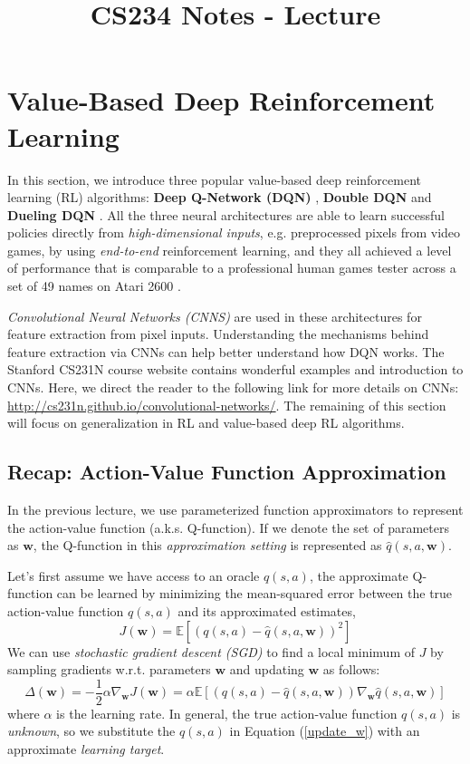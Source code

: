 \documentclass{article}
\title{CS234 Notes - Lecture \lecturenum \\ \lecturetitle }
\author{ \lecturescribe }
\newcommand{\E}{\mathbb{E}}                                        %
\newcommand{\w}{\mathbf{w}}
\begin{document}
\maketitle

\section{Value-Based Deep Reinforcement Learning}
In this section, we introduce three popular value-based deep reinforcement learning (RL) algorithms: \textbf{Deep Q-Network (DQN)} \cite{ref_DQN}, \textbf{Double DQN} \cite{ref_DDQN} and \textbf{Dueling DQN} \cite{ref_DuelingDQN}. All the three neural architectures are able to learn successful policies directly from \textit{high-dimensional inputs}, e.g. preprocessed pixels from video games, by using \textit{end-to-end} reinforcement learning, and they all achieved a level of performance that is comparable to a professional human games tester across a set of 49 names on Atari 2600 \cite{ref_atari}.

\textit{Convolutional Neural Networks (CNNS)} \cite{ref_cnn} are used in these architectures for feature extraction from pixel inputs. Understanding the mechanisms behind feature extraction via CNNs can help better understand how DQN works. The Stanford CS231N course website contains wonderful examples and introduction to CNNs. Here, we direct the reader to the following link for more details on CNNs: \url{http://cs231n.github.io/convolutional-networks/}. The remaining of this section will focus on generalization in RL and value-based deep RL algorithms.


\subsection{Recap: Action-Value Function Approximation}
In the previous lecture, we use parameterized function approximators to represent the action-value function (a.k.s. Q-function). If we denote the set of parameters as $\mathbf{w}$, the Q-function in this \textit{approximation setting} is represented as $\hat{q}(s, a, \mathbf{w})$.

Let's first assume we have access to an oracle $q(s,a)$, the approximate Q-function can be learned by minimizing the mean-squared error between the true action-value function $q(s,a)$ and its approximated estimates,
\begin{equation} \label{mse_true_q}
   J(\mathbf{w}) = \E[(q(s,a) - \hat{q}(s,a, \w) )^2]
\end{equation}
We can use \textit{stochastic gradient descent (SGD)} to find a local minimum of $J$ by sampling gradients w.r.t. parameters $\w$ and updating $\w$ as follows:
\begin{equation} \label{update_w}
  \Delta(\w) = -\frac{1}{2} \alpha \nabla_\w J(\w) = \alpha \E[(q(s,a) - \hat{q}(s,a, \w) ) \nabla_\w \hat{q}(s,a, \w)]
\end{equation}
where $\alpha$ is the learning rate. In general, the true action-value function $q(s,a)$ is \textit{unknown}, so we substitute the $q(s,a)$ in Equation (\ref{update_w}) with an approximate \textit{learning target}.
\end{document}
